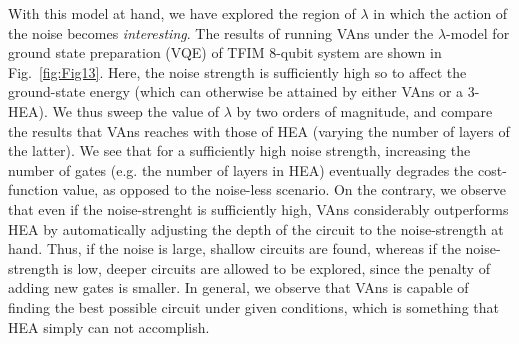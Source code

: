 With this model at hand, we have explored the region of $\lambda$ in which the action of the noise becomes \textit{interesting}. The results of running VAns under the $\lambda$-model for ground state preparation (VQE) of TFIM 8-qubit system are shown in Fig.~\ref{fig:Fig13}. Here, the noise strength is sufficiently high so to affect the ground-state energy (which can otherwise be attained by either VAns or a 3-HEA). We thus sweep the value of $\lambda$ by two orders of magnitude, and compare the results that VAns reaches with those of HEA (varying the number of layers of the latter). We see that for a sufficiently high noise strength, increasing the number of gates (e.g. the number of layers in HEA) eventually degrades the cost-function value, as opposed to the noise-less scenario. On the contrary, we observe that even if the noise-strenght is sufficiently high, VAns considerably outperforms HEA by automatically adjusting the depth of the circuit to the noise-strength at hand. Thus, if the noise is large, shallow circuits are found, whereas if the noise-strength is low, deeper circuits are allowed to be explored, since the penalty of adding new gates is smaller. In general, we observe that VAns is capable of finding the best possible circuit under given conditions, which is something that HEA simply can not accomplish.

\afterpage{\clearpage}
